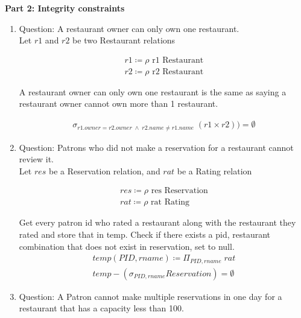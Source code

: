 \documentclass{article}
\begin{document}
\begin{LARGE}
\textbf{Part 2: Integrity constraints}
\end{LARGE}

\begin{enumerate}
	\item %
	Question: A restaurant owner can only own one restaurant.\\
    
        Let $r1$ and $r2$ be two Restaurant relations
        
        \begin{align}
        r1\coloneqq \rho \text{  r1 Restaurant}  \\
        r2\coloneqq \rho \text{  r2 Restaurant}
		\end{align}     
		
		A restaurant owner can only own one restaurant is the same as saying a restaurant owner cannot own more than 1 restaurant. 
		 
		\begin{align}
        \sigma_{r1.owner = r2.owner \; \wedge \; r2.name \neq r1.name}\;(r1 \times r2)) = \emptyset
		\end{align} 
		
	\item %
	Question: Patrons who did not make a reservation for a restaurant cannot review it.\\
    
        Let $res$ be a Reservation relation, and $rat$ be a Rating relation
        
        \begin{align}
        res\coloneqq \rho \text{  res Reservation}  \\
        rat\coloneqq \rho \text{  rat Rating}
		\end{align}     
		
		Get every patron id who rated a restaurant along with the restaurant they rated and store that in temp.
		 Check if there exists a pid, restaurant combination that does not exist in reservation, set to null.
		\begin{align}
        temp(PID, rname)\coloneqq \Pi_{PID,rname}\; rat\\
        temp - (\sigma_{PID, rname} Reservation) = \emptyset
		\end{align} 
	\item %
	Question: A Patron cannot make multiple reservations in one day for a restaurant that has a capacity less than
100.\\
    

\end{enumerate}
\end{document}
